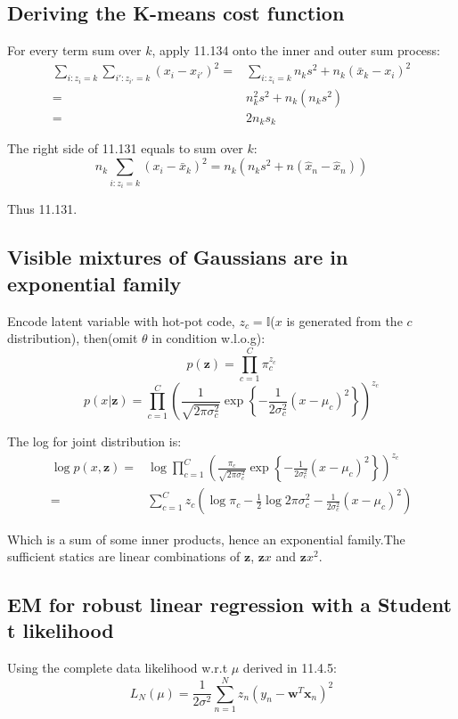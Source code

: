 \documentclass[UTF8]{ctexart}
\begin{document}
\subsection{Deriving the K-means cost function}
For every term sum over $k$, apply 11.134 onto the inner and outer sum process:
\begin{align}
\sum_{i:z_{i}=k}\sum_{i':z_{i'}=k}(x_{i}-x_{i'})^{2}=&\sum_{i:z_{i}=k}n_{k}s^{2}+n_{k}(\bar{x}_{k}-x_{i})^{2}\nonumber \\
=& n_{k}^{2}s^{2}+n_{k}(n_{k}s^{2})\nonumber \\
=& 2n_{k}s_{k}\nonumber 
\end{align}

The right side of 11.131 equals to sum over $k$:
$$n_{k}\sum_{i:z_{i}=k}(x_{i}-\bar{x}_{k})^{2}=n_{k}(n_{k}s^{2}+n(\hat{x}_{n}-\hat{x}_{n}))$$

Thus 11.131. 

\subsection{Visible mixtures of Gaussians are in exponential family}
Encode latent variable with hot-pot code, $z_{c}=\mathbb{I}$($x$ is generated from the $c$ distribution), then(omit $\theta$ in condition w.l.o.g):
$$p(\textbf{z})=\prod_{c=1}^{C}\pi_{c}^{z_{c}}$$
$$p(x|\textbf{z})=\prod_{c=1}^{C}(\frac{1}{\sqrt{2\pi \sigma_{c}^{2}}}\exp\left\{ -\frac{1}{2\sigma_{c}^{2}}(x-\mu_{c})^{2} \right\})^{z_{c}}$$

The log for joint distribution is:
\begin{align}
\log p(x,\textbf{z})=&\log \prod_{c=1}^{C}(\frac{\pi_{c}}{\sqrt{2\pi \sigma_{c}^{2}}}\exp\left\{ -\frac{1}{2\sigma_{c}^{2}}(x-\mu_{c})^{2} \right\})^{z_{c}}\nonumber \\
=&\sum_{c=1}^{C}z_{c}(\log \pi_{c} -\frac{1}{2}\log 2\pi \sigma_{c}^{2} - \frac{1}{2\sigma_{c}^{2}}(x-\mu_{c})^{2})\nonumber
\end{align}

Which is a sum of some inner products, hence an exponential family.The sufficient statics are linear combinations of $\textbf{z}$, $\textbf{z}x$ and $\textbf{z}x^{2}$.

\subsection{EM for robust linear regression with a Student t likelihood}
Using the complete data likelihood w.r.t $\mu$ derived in 11.4.5:
$$L_{N}(\mu)=\frac{1}{2\sigma^{2}} \sum_{n=1}^{N}z_{n}(y_{n}-\textbf{w}^{T}\textbf{x}_{n})^{2}$$
\end{document}
